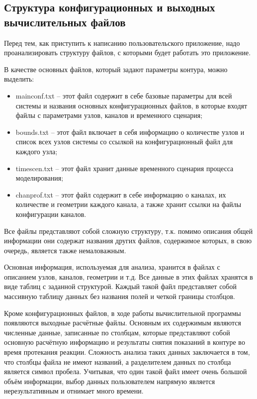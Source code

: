 \subsection{Структура конфигурационных и выходных вычислительных файлов}

Перед тем, как приступить к написанию пользовательского приложение, надо проанализировать структуру файлов, с которыми будет работать это приложение. 

В качестве основных файлов, который задают параметры контура, можно выделить:
\begin{itemize}
\item mainconf.txt – этот файл содержит в себе базовые параметры для всей системы и названия основных конфигурационных файлов, в которые входят файлы с параметрами узлов, каналов и временного сценария;
\item bounds.txt – этот файл включает в себя информацию о количестве узлов и список всех узлов системы со ссылкой на конфигурационный файл для каждого узла;
\item timescen.txt – этот файл хранит данные временного сценария процесса моделирования;
\item chanprof.txt – этот файл содержит в себе информацию о каналах, их количестве и геометрии каждого канала, а также хранит ссылки на файлы конфигурации каналов.
\end{itemize}

Все файлы представляют собой сложную структуру, т.к. помимо описания общей информации они содержат названия других файлов, содержимое которых, в свою очередь, является также немаловажным.

Основная информация, используемая для анализа, хранится в файлах с описанием узлов, каналов, геометрии и т.д. Все данные в этих файлах хранятся в виде таблиц с заданной структурой. Каждый такой файл представляет собой массивную таблицу данных без названия полей и четкой границы столбцов. 

Кроме конфигурационных файлов, в ходе работы вычислительной программы появляются выходные расчётные файлы. Основным их содержимым являются численные данные, записанные по столбцам, которые представляют собой основную расчётную информацию и результаты снятия показаний в контуре во время протекания реакции. Сложность анализа таких данных заключается в том, что столбцы файла не имеют названий, а разделителем данных по столбца является символ пробела. Учитывая, что один такой файл имеет очень большой объём информации, выбор данных пользователем напрямую является нерезультативным и отнимает много времени. 


